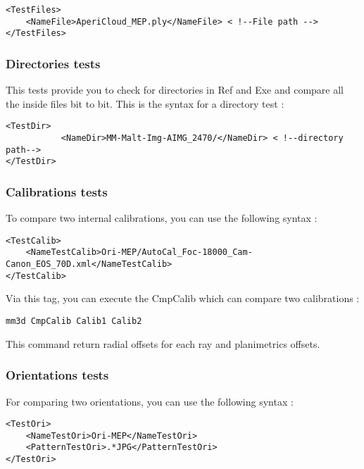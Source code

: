 \documentclass[a4paper]{book}
\begin{document}
\begin{lstlisting}
<TestFiles> 
	<NameFile>AperiCloud_MEP.ply</NameFile> < !--File path --> 
</TestFiles>
\end{lstlisting}

\subsubsection{Directories tests}
This tests provide you to check for directories in Ref and Exe and compare all the inside files bit to bit. This is the syntax for a directory test :

\begin{lstlisting}
<TestDir> 
           <NameDir>MM-Malt-Img-AIMG_2470/</NameDir> < !--directory path-->
</TestDir>
\end{lstlisting}

\subsubsection{Calibrations tests}
To compare two internal calibrations, you can use the following syntax :

\begin{lstlisting}
<TestCalib> 
	<NameTestCalib>Ori-MEP/AutoCal_Foc-18000_Cam-Canon_EOS_70D.xml</NameTestCalib> 
</TestCalib>
\end{lstlisting}

Via this tag, you can execute the CmpCalib which can compare two calibrations :
\begin{verbatim}
mm3d CmpCalib Calib1 Calib2
\end{verbatim}

This command return radial offsets for each ray and planimetrics offsets.

\subsubsection{Orientations tests}
For comparing two orientations, you can use the following syntax :

\begin{lstlisting}
<TestOri> 
	<NameTestOri>Ori-MEP</NameTestOri>
	<PatternTestOri>.*JPG</PatternTestOri>
</TestOri>
\end{lstlisting}
\end{document}

